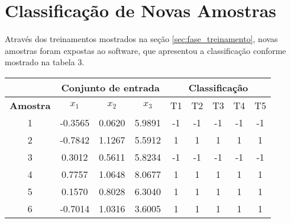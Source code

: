 \documentclass{article}
\begin{document}
\section{Classificação de Novas Amostras}
\par Através dos treinamentos mostrados na seção \ref{sec:fase_treinamento}, novas amostras foram expostas ao software, que apresentou a classificação conforme mostrado na tabela 3.
\begin{table}[]
  \renewcommand\thetable{3}
\centering
\begin{tabular}{c|c|c|c|c|c|c|c|c|}
\cline{2-9}
\multicolumn{1}{l|}{}                  & \multicolumn{3}{c|}{Conjunto de entrada} & \multicolumn{5}{c|}{Classifica\c{c}\~{a}o}                                                                             \\ \hline
\multicolumn{1}{|c|}{\textbf{Amostra}} & $x_1$        & $x_2$       & $x_3$      & T1                      & T2                      & T3                      & T4                      & T5                      \\ \hline
\multicolumn{1}{|c|}{1}                & -0.3565      & 0.0620       & 5.9891     & -1                      & -1                      & -1                      & -1                      & -1                      \\ \hline
\multicolumn{1}{|c|}{2}                & -0.7842      & 1.1267       & 5.5912     & 1                       & 1                       & 1                       & 1                       & 1                       \\ \hline
\multicolumn{1}{|c|}{3}                & 0.3012       & 0.5611       & 5.8234     & -1                      & -1                      & -1                      & -1                      & -1                      \\ \hline
\multicolumn{1}{|c|}{4}                & 0.7757       & 1.0648       & 8.0677     & 1                       & 1                       & 1                       & 1                       & 1                       \\ \hline
\multicolumn{1}{|c|}{5}                & 0.1570       & 0.8028       & 6.3040     & 1                       & 1                       & 1                       & 1                       & 1                       \\ \hline
\multicolumn{1}{|c|}{6}                & -0.7014      & 1.0316       & 3.6005     & 1                       & 1                       & 1                       & 1                       & 1                       \\ \hline

\end{tabular}
\end{table}
\end{document}
